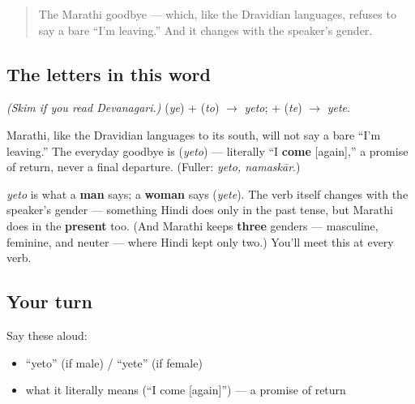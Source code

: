 \label{lesson:MR-C01-yeto}



\begin{quote}
The Marathi goodbye — which, like the Dravidian languages, refuses to say a bare \textquotedblleft{}I'm leaving.\textquotedblright{} And it changes with the speaker's gender.
\end{quote}

\subsection*{The letters in this word}
\emph{(Skim if you read Devanagari.)} \textbf{} (\emph{ye}) + \textbf{} (\emph{to}) $\to$ \emph{yeto}; \textbf{} + \textbf{} (\emph{te}) $\to$ \emph{yete}.

\begin{cousinweb}
Marathi, like the Dravidian languages to its south, will not say a bare \textquotedblleft{}I'm leaving.\textquotedblright{} The everyday goodbye is \textbf{} (\emph{yeto}) — literally \textquotedblleft{}I \textbf{come} {[}again{]},\textquotedblright{} a promise of return, never a final departure. (Fuller: \emph{yeto, namaskār}.)
\end{cousinweb}

\begin{grammarlens}[title={Grammar Lens: Marathi verbs carry gender}]
\emph{yeto} is what a \textbf{man} says; a \textbf{woman} says \textbf{} (\emph{yete}). The verb itself changes with the speaker's gender — something Hindi does only in the past tense, but Marathi does in the \textbf{present} too. (And Marathi keeps \textbf{three} genders — masculine, feminine, and neuter — where Hindi kept only two.) You'll meet this at every verb.
\end{grammarlens}

\subsection*{Your turn}
Say these aloud:

\begin{itemize}
\raggedright
  \item \textquotedblleft{}yeto\textquotedblright{} (if male) / \textquotedblleft{}yete\textquotedblright{} (if female)
  \item what it literally means (\textquotedblleft{}I come {[}again{]}\textquotedblright{}) — a promise of return
\end{itemize}

